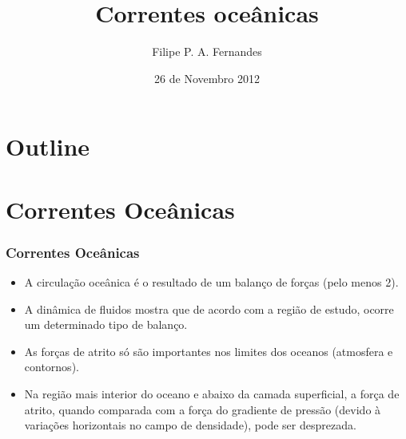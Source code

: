 \title[Aula 10]{Correntes oceânicas}
\author[Filipe Fernandes]{Filipe P. A. Fernandes}
\date[Novembro 2012]{26 de Novembro 2012}




\begin{frame}[plain]
  \titlepage
\end{frame}

\section*{Outline}
\begin{frame}
\tableofcontents
\end{frame}

\section{Correntes Oceânicas}
\begin{frame}
\frametitle{Correntes Oceânicas}
\small{
  \begin{itemize}[<+-| alert@+>]
    \item A circulação oceânica é o resultado de um balanço de forças
          (pelo menos 2).
    \item A dinâmica de fluidos mostra que de acordo com a região de
          estudo, ocorre um determinado tipo de balanço.
    \item As forças de atrito só são importantes nos limites dos
          oceanos (atmosfera e contornos).
    \item Na região mais interior do oceano e abaixo da camada
          superficial, a força de atrito, quando comparada com a força
          do gradiente de pressão (devido à variações horizontais no
          campo de densidade), pode ser desprezada.
  \end{itemize}
  }
\end{frame}

